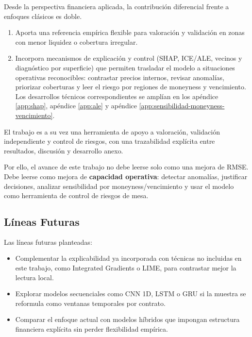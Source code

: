 Desde la perspectiva financiera aplicada, la contribución diferencial frente a enfoques clásicos es doble. 
\begin{enumerate}
    \item Aporta una referencia empírica flexible para valoración y validación en zonas con menor liquidez o cobertura irregular. 
    \item Incorpora mecanismos de explicación y control (SHAP, ICE/ALE, vecinos y diagnóstico por superficie) que permiten trasladar el modelo a situaciones operativas reconocibles: contrastar precios internos, revisar anomalías, priorizar coberturas y leer el riesgo por regiones de moneyness y vencimiento. Los desarrollos técnicos correspondientes se amplían en los apéndice \ref{app:shap}, apéndice \ref{app:ale} y apéndice \ref{app:sensibilidad-moneyness-vencimiento}.
\end{enumerate}

El trabajo es a su vez una herramienta de apoyo a valoración, validación independiente y control de riesgos, con una trazabilidad explícita entre resultados, discusión y desarrollo anexo.

Por ello, el avance de este trabajo no debe leerse solo como una mejora de RMSE. Debe leerse como mejora de \textbf{capacidad operativa}: detectar anomalías, justificar decisiones, analizar sensibilidad por moneyness/vencimiento y usar el modelo como herramienta de control de riesgos de mesa.

\subsection*{Líneas Futuras}
Las líneas futuras planteadas:
\begin{itemize}
    \item Complementar la explicabilidad ya incorporada con técnicas no incluidas en este trabajo, como Integrated Gradients o LIME, para contrastar mejor la lectura local.
    \item Explorar modelos secuenciales como CNN 1D, LSTM o GRU si la muestra se reformula como ventanas temporales por contrato.
    \item Comparar el enfoque actual con modelos híbridos que impongan estructura financiera explícita sin perder flexibilidad empírica.
\end{itemize}
